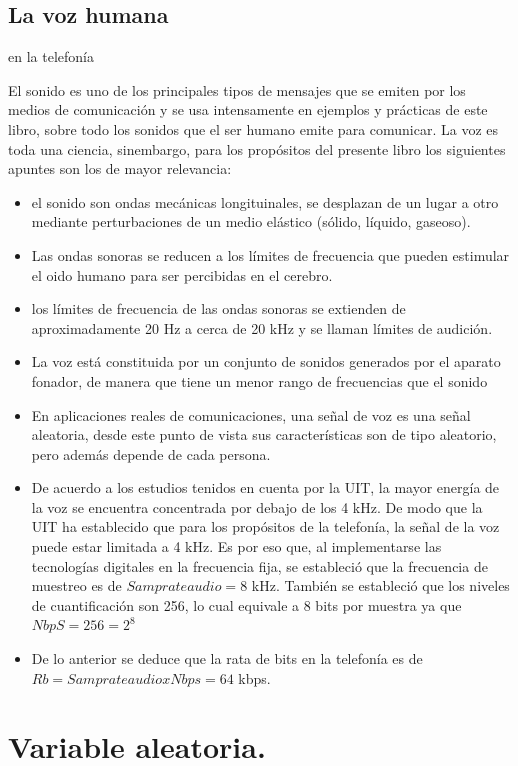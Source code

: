 \subsection{La voz humana} en la telefonía

El sonido es uno de los principales tipos de mensajes que se emiten por los medios de comunicación y se usa intensamente en ejemplos y prácticas de este libro, sobre todo los sonidos que el ser humano emite para comunicar. La voz es toda una ciencia, sinembargo, para los propósitos del presente libro los siguientes apuntes son los de mayor relevancia:
\begin{itemize}
    \item el sonido son ondas mecánicas longituinales, se desplazan de un lugar a otro mediante perturbaciones de un medio elástico (sólido, líquido, gaseoso).
    \item Las ondas sonoras se reducen a los límites de frecuencia que pueden estimular el oido humano para ser percibidas en el cerebro.
    \item los límites de frecuencia de las ondas sonoras se extienden de aproximadamente 20 Hz a cerca de 20 kHz y se llaman límites de audición.
    \item La voz está constituida por un conjunto de sonidos generados por el aparato fonador, de manera que tiene un menor rango de frecuencias que el sonido
    \item En aplicaciones reales de comunicaciones, una señal de voz es una señal aleatoria, desde este punto de vista sus características son de tipo aleatorio, pero además depende de cada persona.
    \item De acuerdo a los estudios tenidos en cuenta por la UIT, la mayor energía de la voz se encuentra concentrada por debajo de los 4 kHz. De modo que la UIT ha establecido que para los propósitos de la telefonía, la señal de la voz puede estar limitada a 4 kHz. Es por eso que, al implementarse las tecnologías digitales en la frecuencia fija, se estableció que la frecuencia de muestreo es de $Samp rate   audio=8$  kHz. También se estableció que los niveles de cuantificación son 256, lo cual equivale a 8 bits por muestra ya que $NbpS=256=2^8 $ 
    \item De lo anterior se deduce que la rata de bits en la telefonía es de $Rb=Samp rate audio x Nbps=64$ kbps.
\end{itemize}

\section{Variable aleatoria.}
